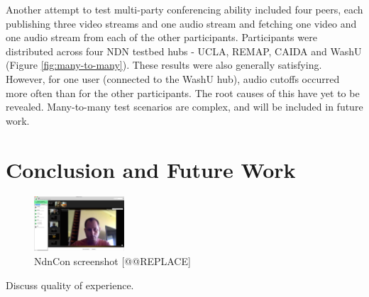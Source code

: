 \documentclass{icn/sig-alternate-2012} %
\newcommand{\ndnconName}{NdnCon}
\begin{document}
Another attempt to test multi-party conferencing ability included four peers, each publishing three video streams and one audio stream and fetching one video and one audio stream from each of the other participants. Participants were distributed across four NDN testbed hubs - UCLA, REMAP, CAIDA and WashU (Figure \ref{fig:many-to-many}). These results were also generally satisfying. However, for one user (connected to the WashU hub), audio cutoffs occurred more often than for the other participants. The root causes of this have yet to be revealed. Many-to-many test scenarios are complex, and will be included in future work.

\section{Conclusion and Future Work}
\label{sec:conclusion}

\begin{figure}[t!]
\centering
\includegraphics[width=0.3\textwidth]{ndncon}
\caption{\ndnconName{} screenshot [@@REPLACE]}
\label{fig:ndncon}
\end{figure}


Discuss quality of experience. 
\end{document}
